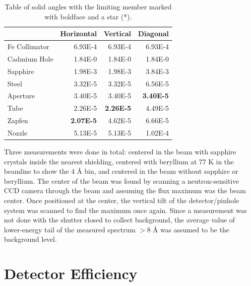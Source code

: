 \documentclass[5p,12pt]{elsarticle}
\begin{document}
\begin{table}
\scriptsize
\begin{center}
     \caption{Table of solid angles with the limiting member marked with boldface and a star (*).  \label{tab:sa} }
\begin{tabular}{|l|r|r|r|}
     \hline
                   &     Horizontal  &     Vertical   &     Diagonal   \\
     \hline
     Fe Collimator &     6.93E-4  &     6.93E-4 &     6.93E-4 \\
     \hline 
     Cadmium Hole  &     1.84E-0  &     1.84E-0 &     1.84E-0 \\
     \hline 
     Sapphire      &     1.98E-3  &     1.98E-3 &     3.84E-3 \\
     \hline 
     Steel         &     3.32E-5  &     3.32E-5 &     6.56E-5 \\
     \hline
     Aperture      &     3.40E-5  &     3.40E-5 &\bf* 3.40E-5 \\
     \hline
     Tube          &     2.26E-5  &\bf* 2.26E-5 &     4.49E-5  \\
     \hline
     Zapfen        &\bf* 2.07E-5  &     4.62E-5 &     6.66E-5 \\
     \hline
     Nozzle        &     5.13E-5  &     5.13E-5 &     1.02E-4 \\
     \hline
\end{tabular}
\end{center}
\end{table}

Three measurements were done in total: centered in the beam with sapphire crystals inside the nearest shielding, centered with beryllium at 77 K in the beamline to show the 4 {\AA} bin, and centered in the beam without sapphire or beryllium.  The center of the beam was found by scanning a neutron-sensitive CCD camera through the beam and assuming the flux maximum was the beam center.  Once positioned at the center, the vertical tilt of the detector/pinhole system was scanned to find the maximum once again.  Since a measurement was not done with the shutter closed to collect background, the average value of lower-energy tail of the measured spectrum $>$8 {\AA} was assumed to be the background level.

%
%
%
%
%

%
%
%
%
%


\section{Detector Efficiency}
\label{sec:eff}
\end{document}
